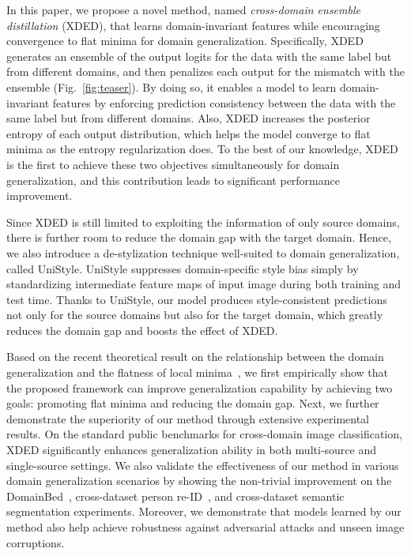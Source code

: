 \documentclass[runningheads]{llncs}
\begin{document}
In this paper, we propose a novel method, named \emph{cross-domain ensemble distillation} (XDED), that learns domain-invariant features while encouraging convergence to flat minima for domain generalization.
Specifically, XDED generates an ensemble of the output logits for the data with the same label but from different domains, and then penalizes each output for the mismatch with the ensemble (Fig.~\ref{fig:teaser}). 
By doing so, it enables a model to learn domain-invariant features by enforcing prediction consistency between the data with the same label but from different domains. 
Also, 
XDED increases the posterior entropy of each output distribution, which helps the model converge to flat minima as the entropy regularization does.
To the best of our knowledge, XDED is the first to achieve these two objectives simultaneously for domain generalization, and this contribution leads to significant performance improvement.

Since XDED is still limited to exploiting the information of only source domains, there is further room to reduce the domain gap with the target domain. Hence, we also introduce a de-stylization technique well-suited to domain generalization, called UniStyle. UniStyle suppresses domain-specific style bias simply by standardizing intermediate feature maps of input image during both training and test time. Thanks to UniStyle, our model produces style-consistent predictions not only for the source domains but also for the target domain, which greatly reduces the domain gap and boosts the effect of XDED.

Based on the recent theoretical result on the relationship between the domain generalization and the flatness of local minima~\cite{cha2021swad}, we first empirically show that the proposed framework can improve generalization capability by achieving two goals: promoting flat minima and reducing the domain gap. Next, we further demonstrate the superiority of our method through extensive experimental results. 
On the standard public benchmarks for cross-domain image classification, XDED significantly enhances generalization ability in both multi-source and single-source settings. 
We also validate the effectiveness of our method in various domain generalization scenarios by showing the non-trivial improvement on the DomainBed~\cite{gulrajani2020search}, cross-dataset person re-ID~\cite{zheng2015scalable,zheng2017unlabeled}, and cross-dataset semantic segmentation experiments. Moreover, we demonstrate that models learned by our method also help achieve robustness against adversarial attacks and unseen image corruptions.
\end{document}
